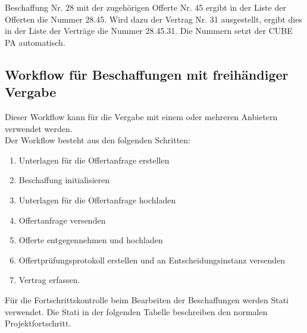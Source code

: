 \vspace{\baselineskip}

Beschaffung Nr. 28 mit der zugehörigen Offerte Nr. 45 ergibt in der Liste der Offerten die Nummer 28.45. Wird dazu der Vertrag Nr. 31 ausgestellt, ergibt dies in der Liste der Verträge die Nummer 28.45.31. Die Nummern setzt der CUBE PA automatisch.

\subsection{Workflow für Beschaffungen mit freihändiger Vergabe}

Dieser Workflow kann für die Vergabe mit einem oder mehreren Anbietern verwendet werden. \\
Der Workflow besteht aus den folgenden Schritten:

\begin{enumerate}
\item Unterlagen für die Offertanfrage erstellen
\item Beschaffung initialisieren
\item Unterlagen für die Offertanfrage hochladen
\item Offertanfrage versenden
\item Offerte entgegennehmen und hochladen
\item Offertprüfungsprotokoll erstellen und an Entscheidungsinstanz versenden
\item Vertrag erfassen.
\end{enumerate}

Für die Fortschrittskontrolle beim Bearbeiten der Beschaffungen werden Stati verwendet. Die Stati in der folgenden Tabelle beschreiben den normalen Projektfortschritt.

\vspace{\baselineskip}

